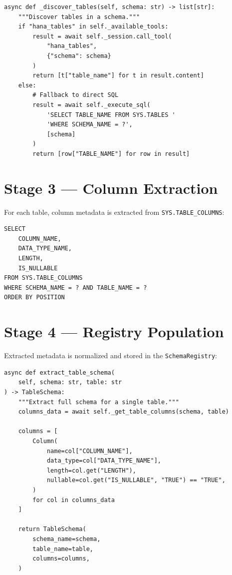 \begin{lstlisting}[language=jsonx,caption={Table discovery (hana\_schema\_extractor.py, lines 85--105)}]
async def _discover_tables(self, schema: str) -> list[str]:
    """Discover tables in a schema."""
    if "hana_tables" in self._available_tools:
        result = await self._session.call_tool(
            "hana_tables",
            {"schema": schema}
        )
        return [t["table_name"] for t in result.content]
    else:
        # Fallback to direct SQL
        result = await self._execute_sql(
            'SELECT TABLE_NAME FROM SYS.TABLES '
            'WHERE SCHEMA_NAME = ?',
            [schema]
        )
        return [row["TABLE_NAME"] for row in result]
\end{lstlisting}

\section{Stage 3 --- Column Extraction}

For each table, column metadata is extracted from \texttt{SYS.TABLE\_COLUMNS}:

\begin{lstlisting}[language=jsonx,caption={Column extraction SQL}]
SELECT 
    COLUMN_NAME,
    DATA_TYPE_NAME,
    LENGTH,
    IS_NULLABLE
FROM SYS.TABLE_COLUMNS
WHERE SCHEMA_NAME = ? AND TABLE_NAME = ?
ORDER BY POSITION
\end{lstlisting}

\section{Stage 4 --- Registry Population}

Extracted metadata is normalized and stored in the \texttt{SchemaRegistry}:

\begin{lstlisting}[language=jsonx,caption={Registry population (hana\_schema\_extractor.py, lines 140--165)}]
async def extract_table_schema(
    self, schema: str, table: str
) -> TableSchema:
    """Extract full schema for a single table."""
    columns_data = await self._get_table_columns(schema, table)
    
    columns = [
        Column(
            name=col["COLUMN_NAME"],
            data_type=col["DATA_TYPE_NAME"],
            length=col.get("LENGTH"),
            nullable=col.get("IS_NULLABLE", "TRUE") == "TRUE",
        )
        for col in columns_data
    ]
    
    return TableSchema(
        schema_name=schema,
        table_name=table,
        columns=columns,
    )
\end{lstlisting}


